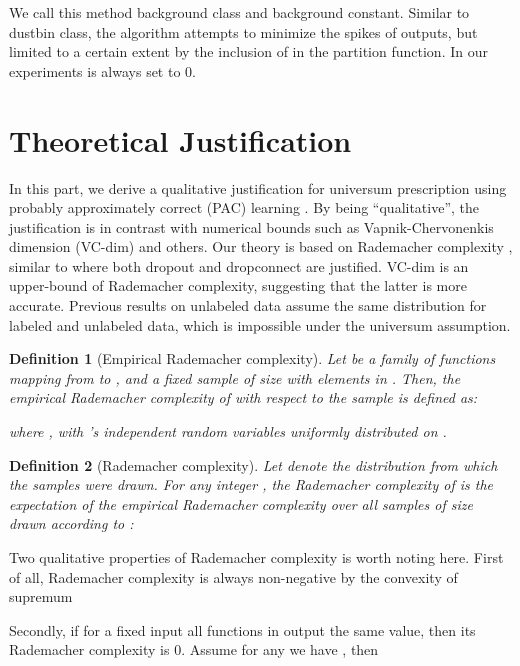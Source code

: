 \documentclass[letterpaper]{article}
\newtheorem{definition}{Definition}
\begin{document}
We call this method background class and  background constant. Similar to dustbin class, the algorithm attempts to minimize the spikes of outputs, but limited to a certain extent by the inclusion of  in the partition function. In our experiments  is always set to 0.

\section{Theoretical Justification}
\label{sec:thry}

In this part, we derive a qualitative justification for universum prescription using probably approximately correct (PAC) learning \cite{V84}. By being ``qualitative'', the justification is in contrast with numerical bounds such as Vapnik-Chervonenkis dimension \cite{VC71} (VC-dim) and others. Our theory is based on Rademacher complexity \cite{BM03}, similar to \cite{WZZLF13} where both dropout \cite{SHKSS14} and dropconnect \cite{WZZLF13} are justified. VC-dim is an upper-bound of Rademacher complexity, suggesting that the latter is more accurate. Previous results on unlabeled data \cite{OAGR11} \cite{OGRA15} assume the same distribution for labeled and unlabeled data, which is impossible under the universum assumption.

\begin{definition}[Empirical Rademacher complexity]
  Let  be a family of functions mapping from  to , and  a fixed sample of size  with elements in . Then, the empirical Rademacher complexity of  with respect to the sample  is defined as:
  
  where , with 's independent random variables uniformly distributed on .
\end{definition}

\begin{definition}[Rademacher complexity]
  Let  denote the distribution from which the samples were drawn. For any integer , the Rademacher complexity of  is the expectation of the empirical Rademacher complexity over all samples of size  drawn according to :
  
\end{definition}

Two qualitative properties of Rademacher complexity is worth noting here. First of all, Rademacher complexity is always non-negative by the convexity of supremum

Secondly, if for a fixed input all functions in  output the same value, then its Rademacher complexity is 0. Assume for any  we have , then
\end{document}
